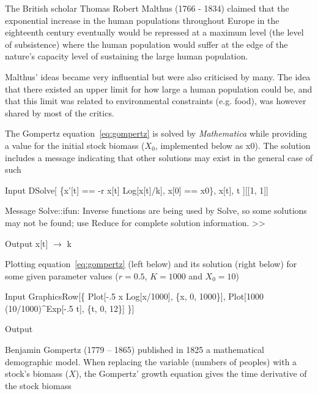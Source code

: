 \documentclass[11pt,fleqn]{book} %
\begin{document}
The British scholar Thomas Robert Malthus (1766 - 1834) claimed that the exponential increase in the human populations throughout Europe in the eighteenth century eventually would be repressed at a maximum level (the level of subsistence) where the human population would suffer at the edge of the nature's capacity level of sustaining the large human population.

Malthus' ideas became very influential but were also criticised by many. The idea that there existed an upper limit for how large a human population could be, and that this limit was related to environmental constraints (e.g. food), was however shared by most of the critics.

\begin{theorem}
\hfill \break
The Gompertz equation~\ref{eq:gompertz} is solved by \textit{Mathematica} while providing a value for the initial stock biomass ($X_0$, implemented below as x0). The solution includes a message indicating that other solutions may exist in the general case of such
\begin{mmaCell}[index=1]{Input}
  DSolve[
    \{x'[t] == -r x[t] Log[x[t]/k], x[0] == x0\}, x[t], t
  ][[1, 1]]
\end{mmaCell}
\begin{mmaCell}[messagelink=message/General/infy]{Message}
  Solve::ifun: Inverse functions are being used by Solve, so some solutions may 
  not be found; use Reduce for complete solution information. >>
\end{mmaCell}
\begin{mmaCell}{Output}
  x[t] \(\to\) k 
\end{mmaCell}
Plotting equation~\ref{eq:gompertz} (left below) and its solution (right below) for some given parameter values ($r = 0.5$, $K = 1000$ and $X_0 = 10$)
\begin{mmaCell}{Input}
  GraphicsRow[\{
    Plot[-.5 x Log[x/1000], \{x, 0, 1000\}],
    Plot[1000 (10/1000)^Exp[-.5 t], \{t, 0, 12\}]
  \}]
\end{mmaCell}
\begin{mmaCell}[moregraphics={moreig={scale=.8}}]{Output}
\end{mmaCell}
\label{code:gompertz}
\end{theorem}
\hfill \break
{}Benjamin Gompertz (1779 – 1865) published in 1825\cite{Gompertz1825} a mathematical demographic model. When replacing the variable (numbers of peoples) with a stock's biomass ($X$), the Gompertz' growth equation gives the time derivative of the stock biomass
\end{document}
